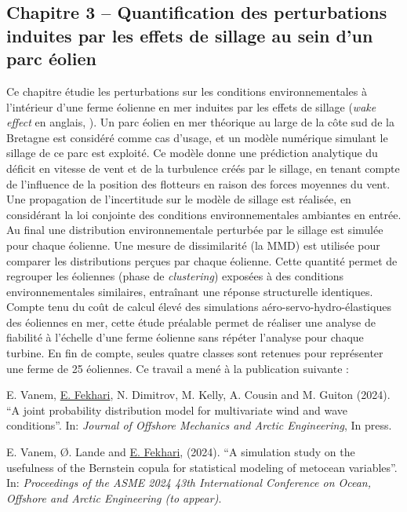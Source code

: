 \subsection*{Chapitre 3 -- Quantification des perturbations induites par les effets de sillage au sein d'un parc \'{e}olien}

Ce chapitre \'{e}tudie les perturbations sur les conditions environnementales à l'int\'{e}rieur d'une ferme \'{e}olienne en mer induites par les effets de sillage (\textit{wake effect} en anglais, \citealp{larsen_2008_wake}). 
Un parc \'{e}olien en mer th\'{e}orique au large de la côte sud de la Bretagne est consid\'{e}r\'{e} comme cas d'usage, et un modèle num\'{e}rique simulant le sillage de ce parc est exploit\'{e}. 
Ce modèle donne une pr\'{e}diction analytique du d\'{e}ficit en vitesse de vent et de la turbulence cr\'{e}\'{e}s par le sillage, en tenant compte de l'influence de la position des flotteurs en raison des forces moyennes du vent. 
Une propagation de l'incertitude sur le modèle de sillage est r\'{e}alis\'{e}e, en consid\'{e}rant la loi conjointe des conditions environnementales ambiantes en entr\'{e}e. 
Au final une distribution environnementale perturb\'{e}e par le sillage est simul\'{e}e pour chaque \'{e}olienne. 
Une mesure de dissimilarit\'{e} (la MMD) est utilis\'{e}e pour comparer les distributions perçues par chaque \'{e}olienne. 
Cette quantit\'{e} permet de regrouper les \'{e}oliennes (phase de \textit{clustering}) expos\'{e}es à des conditions environnementales similaires, entraînant une r\'{e}ponse structurelle identiques. 
Compte tenu du coût de calcul \'{e}lev\'{e} des simulations a\'{e}ro-servo-hydro-\'{e}lastiques des \'{e}oliennes en mer, cette \'{e}tude pr\'{e}alable permet de r\'{e}aliser une analyse de fiabilit\'{e} à l'\'{e}chelle d'une ferme \'{e}olienne sans r\'{e}p\'{e}ter l'analyse pour chaque turbine. 
En fin de compte, seules quatre classes sont retenues pour repr\'{e}senter une ferme de 25 \'{e}oliennes. 
Ce travail a men\'{e} à la publication suivante : 

\medskip
\noindent
{} E. Vanem, \underline{E. Fekhari}, N. Dimitrov, M. Kelly, A. Cousin and M. Guiton (2024). ``A joint probability distribution model for multivariate wind and wave conditions''. In: \textit{Journal of Offshore Mechanics and Arctic Engineering}, In press. 

\medskip
\noindent
{} E. Vanem, \O{}. Lande and \underline{E. Fekhari}, (2024). ``A simulation study on the usefulness of the Bernstein copula for statistical modeling of metocean variables''. In: \textit{Proceedings of the ASME 2024 43th International Conference on Ocean, Offshore and Arctic Engineering (to appear)}.

